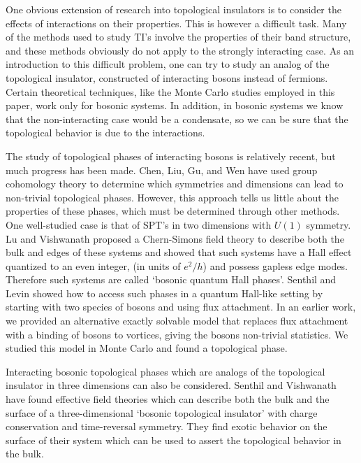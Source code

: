 \documentclass[prb,twocolumn]{revtex4-1}
\begin{document}
One obvious extension of research into topological insulators is to consider the effects of interactions on their properties. This is however a difficult task. Many of the methods used to study TI's involve the properties of their band structure, and these methods obviously do not apply to the strongly interacting case. As an introduction to this difficult problem, one can try to study an analog of the topological insulator, constructed of interacting bosons instead of fermions. Certain theoretical techniques, like the Monte Carlo studies employed in this paper, work only for bosonic systems. In addition, in bosonic systems we know that the non-interacting case would be a condensate, so we can be sure that the topological behavior is due to the interactions.

The study of topological phases of interacting bosons is relatively recent, but much progress has been made. Chen, Liu, Gu, and Wen\cite{WenScience,*WenPRB} have used group cohomology theory to determine which symmetries and dimensions can lead to non-trivial topological phases. However, this approach tells us little about the properties of these phases, which must be determined through other methods. One well-studied case is that of SPT's in two dimensions with $U(1)$ symmetry. 
Lu and Vishwanath\cite{LuVishwanath} proposed a Chern-Simons field theory to describe both the bulk and edges of these systems and showed that such systems have a Hall effect quantized to an even integer, (in units of $e^2/h$) and possess gapless edge modes. Therefore such systems are called `bosonic quantum Hall phases'. 
Senthil and Levin\cite{SenthilLevin} showed how to access such phases in a quantum Hall-like setting by starting with two species of bosons and using flux attachment. 
In an earlier work, we provided an alternative exactly solvable model that replaces flux attachment with a binding of bosons to vortices, giving the bosons non-trivial statistics.
We studied this model in Monte Carlo and found a topological phase.\cite{FQHE}

Interacting bosonic topological phases which are analogs of the topological insulator in three dimensions can also be considered. Senthil and Vishwanath\cite{SenthilVishwanath} have found effective field theories which can describe both the bulk and the surface of a three-dimensional `bosonic topological insulator' with charge conservation and time-reversal symmetry. They find exotic behavior on the surface of their system which can be used to assert the topological behavior in the bulk. 
\end{document}
